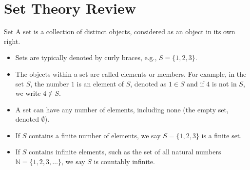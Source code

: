 \section{Set Theory Review}

\begin{definitionbox}{Set}
A set is a collection of distinct objects, considered as an object in its own right. 
\begin{itemize}
    \item Sets are typically denoted by curly braces, e.g., \( S = \{1, 2, 3\} \). 
    \item The objects within a set are called elements or members. For example, in the set \( S \), the number \( 1 \) is an element of \( S \), denoted as \( 1 \in S \) and if \( 4 \) is not in \( S \), we write \( 4 \notin S \).
    \item A set can have any number of elements, including none (the empty set, denoted \( \emptyset \)). 
    \item If \(S\) contains a finite number of elements, we say \(S = \{1,2,3\}\) is a finite set.
    \item If \(S\) contains infinite elements, such as the set of all natural numbers \( \mathbb{N} = \{1, 2, 3, \ldots\} \), we say \(S\) is countably infinite.
\end{itemize}

\end{definitionbox}


